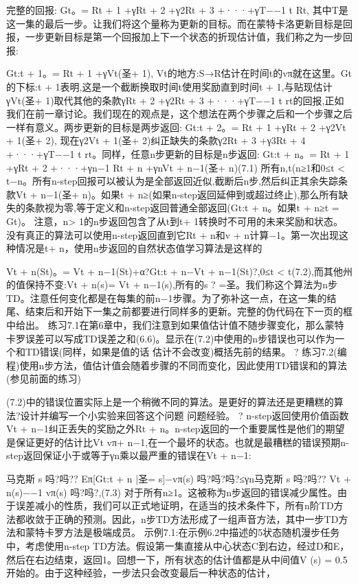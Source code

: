 完整的回报:
Gt。= Rt + 1 +γRt + 2 +γ2Rt + 3 +···+γT−−1 t Rt,
其中T是这一集的最后一步。让我们将这个量称为更新的目标。而在蒙特卡洛更新目标是回报，一步更新目标是第一个回报加上下一个状态的折现估计值，我们称之为一步回报:

Gt:t + 1。= Rt + 1 +γVt(圣+ 1),
Vt的地方:S→R估计在时间t的vπ就在这里。Gt的下标:t + 1表明,这是一个截断换取时间t使用奖励直到时间t + 1,与贴现估计γVt(圣+ 1)取代其他的条款γRt + 2 +γ2Rt + 3 +···+γT−−1 t rt的回报,正如我们在前一章讨论。我们现在的观点是，这个想法在两个步骤之后和一个步骤之后一样有意义。两步更新的目标是两步返回:
Gt:t + 2。= Rt + 1 +γRt + 2 +γ2Vt + 1(圣+ 2),
现在γ2Vt + 1(圣+ 2)纠正缺失的条款γ2Rt + 3 +γ3Rt + 4 +···+γT−−1 t rt。同样，任意n步更新的目标是n步返回:
Gt:t + n。= Rt + 1 +γRt + 2 +···+γn−1 Rt + n +γnVt + n−1(圣+ n)(7.1)
所有n,t(n≥1和0≤t < t−n。所有n-step回报可以被认为是全部返回近似,截断后n步,然后纠正其余失踪条款Vt + n−1(圣+ n)。如果t + n≥(如果n-step返回延伸到或超过终止),那么所有缺失的条款视为零,等于定义和n-step返回普通全部返回(Gt:t + n。如果t + n≥t = Gt)。
注意，n> 1的n步返回包含了从t到t+ 1转换时不可用的未来奖励和状态。没有真正的算法可以使用n-step返回直到它Rt + n和v + n计算−1。第一次出现这种情况是t+ n，使用n步返回的自然状态值学习算法是这样的

Vt + n(St)。= Vt + n−1(St)+α?Gt:t + n−Vt + n−1(St)?,0≤t < t(7.2),而其他州的值保持不变:Vt + n(s)= Vt + n−1(s),所有的s ? =圣。我们称这个算法为n步TD。注意任何变化都是在每集的前n−1步骤。为了弥补这一点，在这一集的结尾、结束后和开始下一集之前都要进行同样多的更新。完整的伪代码在下一页的框中给出。
练习7.1在第6章中，我们注意到如果值估计值不随步骤变化，那么蒙特卡罗误差可以写成TD误差之和(6.6)。显示在(7.2)中使用的n步错误也可以作为一个和TD错误(同样，如果是值的话
估计不会改变)概括先前的结果。 					?
练习7.2(编程)使用n步方法，值估计值会随着步骤的不同而变化，因此使用TD错误和的算法(参见前面的练习)

(7.2)中的错误位置实际上是一个稍微不同的算法。是更好的算法还是更糟糕的算法?设计并编写一个小实验来回答这个问题
问题经验。 					?
n-step返回使用价值函数Vt + n−1纠正丢失的奖励之外Rt + n。n-step返回的一个重要属性是他们的期望是保证更好的估计比Vt vπ+ n−1,在一个最坏的状态。也就是最糟糕的错误预期n-step返回保证小于或等于γn乘以最严重的错误在Vt + n−1:

马克斯
s
吗?吗?? Eπ[Gt:t + n |圣= s]−vπ(s)
吗?吗?吗?≤γn马克斯
s
吗?吗?? Vt + n(s)−−1 vπ(s)
吗?吗?,(7.3)
对于所有n≥1。这被称为n步返回的错误减少属性。由于误差减小的性质，我们可以正式地证明，在适当的技术条件下，所有n阶TD方法都收敛于正确的预测。因此，n步TD方法形成了一组声音方法，其中一步TD方法和蒙特卡罗方法是极端成员。
示例7.1:在示例6.2中描述的5状态随机漫步任务中，考虑使用n-step TD方法。假设第一集直接从中心状态C到右边，经过D和E，然后在右边结束，返回1。回想一下，所有状态的估计值都是从中间值V (s) = 0.5开始的。由于这种经验，一步法只会改变最后一种状态的估计，

